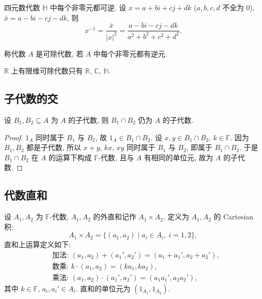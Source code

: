 \begin{example}\label{ex:quaternion-inverse}
四元数代数 $\mathbb{H}$ 中每个非零元都可逆.
设 $x=a+bi+cj+dk$ ($a,b,c,d$ 不全为 $0$), $\bar{x}=a-bi-cj-dk$, 则
\[
  x^{-1}=\frac{\bar{x}}{|x|^2}=\frac{a-bi-cj-dk}{a^2+b^2+c^2+d^2}.
\]
\end{example}

\begin{definition}[可除代数]\label{def:division-algebra}
称代数 $A$ 是可除代数, 若 $A$ 中每个非零元都有逆元.
\end{definition}

\begin{theorem}[Frobenius]\label{thm:frobenius}
$\mathbb{R}$ 上有限维可除代数只有 $\mathbb{R}$, $\mathbb{C}$, $\mathbb{H}$.
\end{theorem}

\subsection{子代数的交}

\begin{proposition}\label{prop:intersection}
设 $B_1,B_2\subseteq A$ 为 $A$ 的子代数, 则 $B_1\cap B_2$ 仍为 $A$ 的子代数.
\end{proposition}

\begin{proof}
$1_A$ 同时属于 $B_1$ 与 $B_2$, 故 $1_A\in B_1\cap B_2$. 设 $x,y\in B_1\cap B_2$, $k\in \mathbb{F}$.
因为 $B_1,B_2$ 都是子代数, 所以 $x+y$, $kx$, $xy$ 同时属于 $B_1$ 与 $B_2$, 即属于 $B_1\cap B_2$.
于是 $B_1\cap B_2$ 在 $A$ 的运算下构成 $\mathbb{F}$-代数, 且与 $A$ 有相同的单位元, 故为 $A$ 的子代数.
\end{proof}

\subsection{代数直和}

\begin{definition}[外直和]\label{def:direct-sum}
设 $A_1,A_2$ 为 $\mathbb{F}$-代数, $A_1,A_2$ 的外直和记作 $A_1\times A_2$, 定义为 $A_1,A_2$ 的 Cartesian 积:
\[
  A_1\times A_2=\{(a_1,a_2)\mid a_i\in A_i,\ i=1,2\},
\]
直和上运算定义如下:
\[\begin{aligned}
  &\text{加法: }  (a_1,a_2)+(a_1',a_2')=(a_1+a_1',a_2+a_2'),\\
  &\text{数乘: }  k\cdot(a_1,a_2)=(ka_1,ka_2),\\
  &\text{乘法: }  (a_1,a_2)\cdot(a_1',a_2')=(a_1a_1',a_2a_2'),
\end{aligned}\]
其中 $k\in \mathbb{F}$, $a_i,a_i'\in A_i$. 直和的单位元为 $(1_{A_1},1_{A_2})$.
\end{definition}

